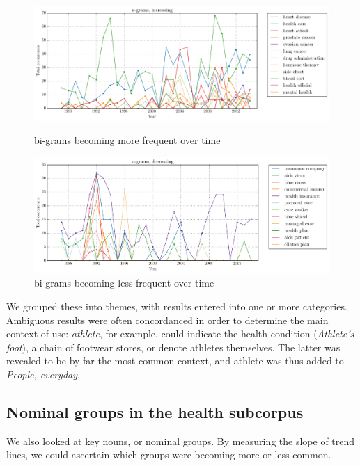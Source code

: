     \noindent
    \begin{figure}[htb!]
    \centering
    \begin{minipage}{.42\textwidth}
    \centering
    \includegraphics[width=1\textwidth]{../images/ngrams-increasing.png}
    \caption{bi-grams becoming more frequent over time}
    \label{fig:ngram-inc}
    \end{minipage}%
    \begin{minipage}{.42\textwidth}
    \centering
    \includegraphics[width=1\textwidth]{../images/ngrams-decreasing.png}
    \caption{bi-grams becoming less frequent over time}
    \label{fig:ngram-dec}
    \end{minipage}
    \end{figure}

We grouped these into themes, with results entered into one or more categories. Ambiguous results were often concordanced in order to determine the main context of use: \emph{athlete}, for example, could indicate the health condition (\emph{Athlete's foot}), a chain of footwear stores, or denote athletes themselves. The latter was revealed to be by far the most common context, and athlete was thus added to \emph{People, everyday}.

\subsection{Nominal groups in the health subcorpus}

We also looked at key nouns, or nominal groups. By measuring the slope of trend lines, we could ascertain which groups were becoming more or less common.

